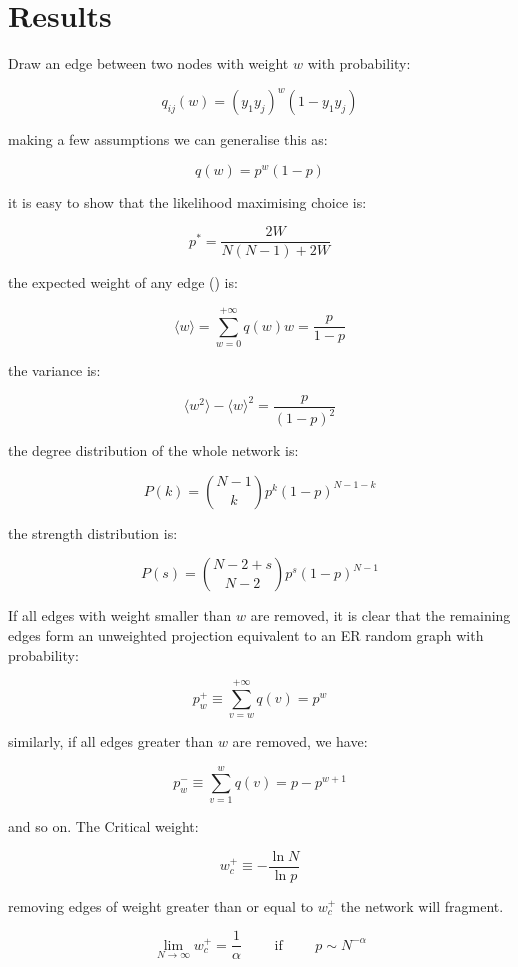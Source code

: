 \documentclass{report}
\begin{document}
\chapter{Results}

Draw an edge between two nodes with weight $w$ with probability: \bigskip

\[
	q_{ij}(w) = (y_1 y_j)^w (1 - y_1 y_j)
\]\medskip

making a few assumptions we can generalise this as: \bigskip

\[
	q(w) = p^w (1 - p)
\]\medskip

it is easy to show that the likelihood maximising choice is: \bigskip

\[
	p^* = \frac{2W}{N(N - 1) + 2W}
\]\medskip

the expected weight of any edge (\cite{article2}) is: \bigskip

\[
	\langle w \rangle = \sum_{w = 0}^{+\infty} q(w) w = \frac{p}{1 - p}
\]\medskip

the variance is: \bigskip

\[
	\langle w^2 \rangle - \langle w \rangle^2 = \frac{p}{(1 - p)^2}
\]\medskip

the degree distribution of the whole network is: \bigskip

\[
	P(k) = \binom{N - 1}{k} p^k (1 - p)^{N - 1 - k}
\]\medskip

the strength distribution is: \bigskip

\[
	P(s) = \binom{N - 2 + s}{N - 2} p^s (1 - p)^{N - 1}
\]\medskip

If all edges with weight smaller than $w$ are removed, it is clear that the remaining edges form an 
unweighted projection equivalent to an ER random graph with probability: \bigskip

\[
	p_{w}^{+} \equiv \sum_{v = w}^{+\infty} q(v) = p^w
\]\medskip

similarly, if all edges greater than $w$ are removed, we have: \bigskip

\[
	p_{w}^{-} \equiv \sum_{v = 1}^{w} q(v) = p - p^{w + 1}
\]\medskip

and so on. The Critical weight: \bigskip

\[
	w_{c}^{+} \equiv - \frac{\ln{N}}{\ln{p}}
\]\medskip

removing edges of weight greater than or equal to $w_{c}^{+}$ the network will fragment. \bigskip

\[
	\lim_{N \to \infty} w_{c}^{+} = \frac{1}{\alpha} \qquad \text{ if } \qquad p \sim N^{- \alpha}
\]\medskip
\end{document}
